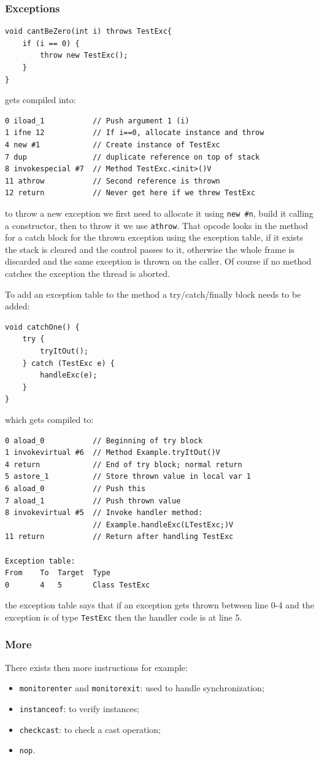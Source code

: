 \subsubsection{Exceptions}
\begin{verbatim}
void cantBeZero(int i) throws TestExc{
    if (i == 0) {
        throw new TestExc();
    }
}
\end{verbatim}
gets compiled into:
\begin{verbatim}
0 iload_1           // Push argument 1 (i)
1 ifne 12           // If i==0, allocate instance and throw
4 new #1            // Create instance of TestExc
7 dup               // duplicate reference on top of stack
8 invokespecial #7  // Method TestExc.<init>()V
11 athrow           // Second reference is thrown
12 return           // Never get here if we threw TestExc
\end{verbatim}
to throw a new exception we first need to allocate it using \verb|new #n|, build it calling a constructor, then to throw it we use \verb|athrow|.
That opcode looks in the method for a catch block for the thrown exception using the exception table, if it exists the stack is cleared and the control passes to it, otherwise the whole frame is discarded and the same exception is thrown on the caller.
Of course if no method catches the exception the thread is aborted.

To add an exception table to the method a try/catch/finally block needs to be added:
\begin{verbatim}
void catchOne() {
    try {
        tryItOut();
    } catch (TestExc e) {
        handleExc(e);
    }
}
\end{verbatim}
which gets compiled to:
\begin{verbatim}
0 aload_0           // Beginning of try block
1 invokevirtual #6  // Method Example.tryItOut()V
4 return            // End of try block; normal return
5 astore_1          // Store thrown value in local var 1
6 aload_0           // Push this
7 aload_1           // Push thrown value
8 invokevirtual #5  // Invoke handler method:
                    // Example.handleExc(LTestExc;)V
11 return           // Return after handling TestExc

Exception table:
From    To  Target  Type
0       4   5       Class TestExc
\end{verbatim}
the exception table says that if an exception gets thrown between line 0-4 and the exception is of type \verb|TestExc| then the handler code is at line 5.

\subsubsection{More}
There exists then more instructions for example:
\begin{itemize}
    \item \verb|monitorenter| and \verb|monitorexit|: used to handle synchronization;
    \item \verb|instanceof|: to verify instances;
    \item \verb|checkcast|: to check a cast operation;
    \item \verb|nop|.
\end{itemize}

